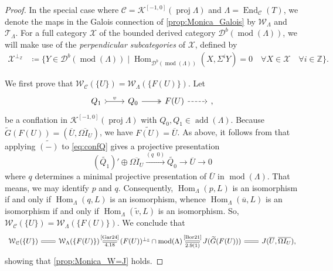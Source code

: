 \documentclass[10pt,twoside, a4paper,reqno]{amsart}
\DeclareMathOperator{\mods}{mod}
\DeclareMathOperator{\Hom}{Hom}
\DeclareMathOperator{\End}{End}
\DeclareMathOperator{\add}{add}
\DeclareMathOperator{\proj}{proj}
\newcommand{\Db}{\mathcal{D}^{b}}
\newcommand{\Ktwo}{\mathcal{K}^{[-1,0]}}
\newcommand{\sth}{\;\vert\;}
\newcommand{\calC}{\mathcal{C}}
\newcommand{\calT}{\mathcal{T}}
\newcommand{\calW}{\mathcal{W}}
\newcommand{\Z}{\mathbb{Z}}
\theoremstyle{definition}
\begin{document}
\begin{proof}
   
   In the special case where $\calC=\Ktwo(\proj\Lambda)$ and $\Lambda=\End_{\calC}(T)$, we denote the maps in the Galois connection {of} \eqref{prop:Monica_Galois} by $\calW_{\Lambda}$ and $\calT_{\Lambda}$. For a full category $\mathcal{X}$ of the bounded derived category $\Db(\mods(\Lambda))$, we will make use of the \textit{perpendicular subcategories} of $\mathcal{X}$, defined by
\begin{align*}
    \mathcal{X}^{\perp_{\Z}} &\coloneqq \{Y\in \Db(\mods(\Lambda)) \sth \Hom_{\Db(\mods(\Lambda))}(X,\Sigma^i Y)=0 \quad \forall X\in\mathcal{X}\quad \forall i\in\Z \}.
\end{align*}

We first prove that $\calW_{\calC}(\{ U\}) = \calW_{\Lambda}(\{F(U)\})$. Let
\begin{equation}\label{eq:confQ}
        \begin{tikzcd}
            Q_1 \arrow[r, tail, "v"] & Q_0 \arrow[r,two heads] & F(U) \arrow[r, dashed] & {},
        \end{tikzcd}
\end{equation}
be a conflation in $\Ktwo(\proj \Lambda)$ with $Q_0, Q_1 \in \add(\Lambda)$. Because $\widetilde{G}(F(U))=(\overline{U}, \overline{\Omega I_U})$, we have $\widetilde{F(U)} = \overline{U}$. As above, it follows from \cite[Prop. 4.5]{PZ24} that applying $\widetilde{(-)}$ to \cref{eq:confQ} gives a projective presentation
\[ (\widetilde{Q_1})' \oplus \overline{\Omega I_U} \xrightarrow{(q \phantom{x} 0)} \widetilde{Q_0} \to \overline{U} \to 0\]
where $q$ determines a minimal projective presentation of $\overline{U}$ in $\mods (\Lambda)$. That means, we may identify $p$ and $q$. Consequently, ${\Hom_{\Lambda}(p,L)}$ is an isomorphism if and only if ${\Hom_{\Lambda}(q,L)}$ is an isomorphism, whence $\Hom_{\Lambda}(\overline{u},L)$ is an isomorphism if and only if $\Hom_{\Lambda}(\widetilde{v}, L)$ is an isomorphism. So, $\calW_{\calC}(\{U\}) = \calW_{\Lambda}(\{F(U)\})$.
We conclude that
\begin{equation}\label{eq:Gar24Bor21w}
\begin{tikzcd}[column sep=2em]
\calW_{\calC}(\{U\}) \arrow[r, equal] & {\calW_{{\Lambda}}(\{F(U)\})} \arrow[r, "{\text{\cite{Gar24}}}", "\text{4.18}"', equal]& (F(U))^{\perp_{\Z}}\cap \mods(\Lambda) \arrow[r, "{\text{\cite{Bor21}}}", "\text{2.9(1)}"', equal] & J(\widetilde{G}(F(U))) \arrow[r, equal]  & J(\overline{U},\overline{\Omega I_U}),
\end{tikzcd}
\end{equation}
showing that \eqref{prop:Monica_W=J} holds.
   

\end{proof}
\end{document}
